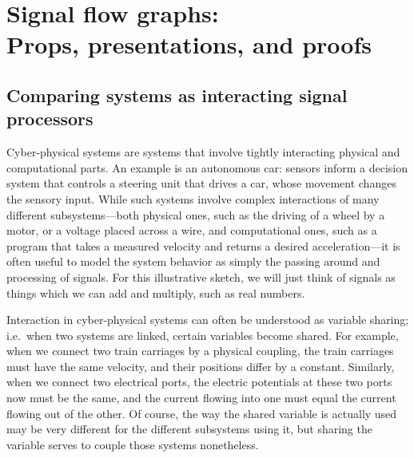 \documentclass[7Sketches]{subfiles}
\begin{document}
\setcounter{chapter}{4}%

\chapter[Signal flow graphs: Props, presentations, \& proofs]{Signal flow graphs:\\Props, presentations, and proofs}%
\label{chap.SFGs}

\section{Comparing systems as interacting signal processors}
%
Cyber-physical systems are systems that involve tightly interacting physical and
computational parts. An example is an autonomous car: sensors inform a decision
system that controls a steering unit that drives a car, whose movement changes the sensory input. While such systems
involve complex interactions of many different subsystems---both physical ones, such
as the driving of a wheel by a motor, or a voltage placed across a wire, and
computational ones, such as a program that takes a measured velocity and returns
a desired acceleration---it is often useful to model the system behavior as
simply the passing around and processing of signals. For this illustrative sketch, we
will just think of signals as things which we can add and multiply, such as real
numbers. 

Interaction in cyber-physical systems can often be understood as variable
sharing; i.e.\ when two systems are linked, certain variables become shared. For
example, when we connect two train carriages by a physical coupling, the train
carriages must have the same velocity, and their positions differ by a constant.
Similarly, when we connect two electrical ports, the electric potentials at
these two ports now must be the same, and the current flowing into one must
equal the current flowing out of the other. %
 Of course, the way the shared variable is actually used may be very different for the different subsystems using it, but sharing the variable serves to couple those systems nonetheless.
\end{document}

